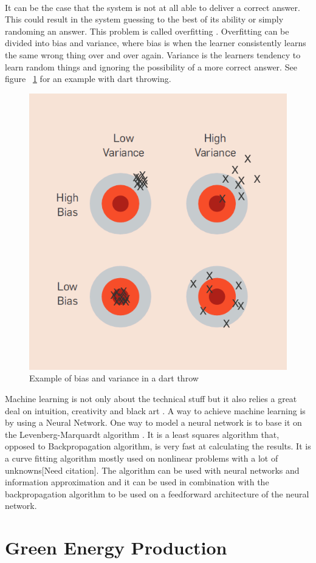 \documentclass[twoside,11pt,openright]{report}
\begin{document}
\\[0.5cm]
It can be the case that the system is not at all able to deliver a correct answer. This could result in the system guessing to the best of its ability or simply randoming an answer. This problem is called overfitting \cite{18}. Overfitting can be divided into bias and variance, where bias is when the learner consistently learns the same wrong thing over and over again. Variance is the learners tendency to learn random things and ignoring the possibility of a more correct answer. See figure ~\ref{fig:biasandvariance} for an example with dart throwing.
\begin{figure}[h!]
\centering
\includegraphics[width=0.5\linewidth,natwidth=898,natheight=587]{billeder/biasVSvariance.png}
\caption{Example of bias and variance in a dart throw \cite{18}}
\label{fig:biasandvariance}
\end{figure}

Machine learning is not only about the technical stuff but it also relies a great deal on intuition, creativity and  black art \cite{18}. 
\newline A way to achieve machine learning is by using a Neural Network. One way to model a neural network is to base it on the
Levenberg-Marquardt algorithm \cite{7,9,10}. It is a least squares algorithm that,
opposed to Backpropagation algorithm\cite{8}, is very fast at calculating the
results. It is a curve fitting algorithm mostly used on nonlinear problems with
a lot of unknowns[Need citation]. The algorithm can be used with neural networks
and information approximation\cite{8} and it can be used in combination with the
backpropagation algorithm to be used on a feedforward architecture of the neural network\cite{13}.

\section{Green Energy Production}
\end{document}
